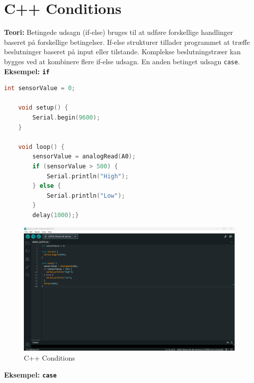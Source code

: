 \section{C++ Conditions}
\textbf{Teori:} Betingede udsagn (if-else) bruges til at udføre forskellige handlinger baseret på forskellige betingelser. If-else strukturer tillader programmet at træffe beslutninger baseret på input eller tilstande. Komplekse beslutningstræer kan bygges ved at kombinere flere if-else udsagn. En anden betinget udsagn \texttt{case}.
\newline\newline
\noindent\textbf{Eksempel: \texttt{if}}
\begin{lstlisting}[language=C++]
	int sensorValue = 0;
	
	void setup() {
		Serial.begin(9600);
	}
	
	void loop() {
		sensorValue = analogRead(A0);
		if (sensorValue > 500) {
			Serial.println("High");
		} else {
			Serial.println("Low");
		}
		delay(1000);}
\end{lstlisting}
\begin{figure}[h!]
	\centering
	\includegraphics[width=\textwidth]{fig/fig8.png}
	\caption{C++ Conditions}
	\label{fig:8}
\end{figure}
\clearpage
\noindent\textbf{Eksempel: \texttt{case}}
